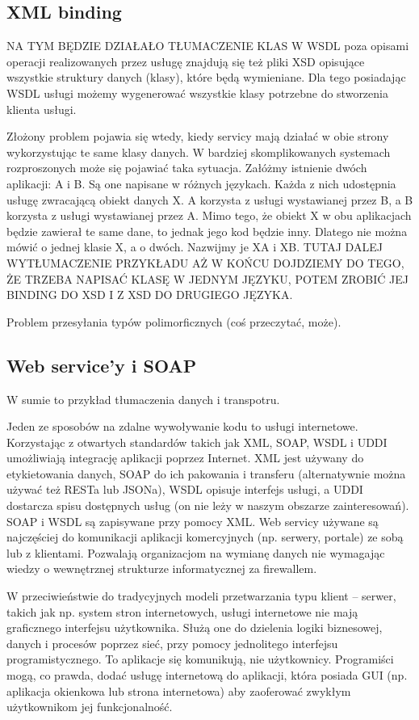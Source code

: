 \subsection{XML binding}
NA TYM BĘDZIE DZIAŁAŁO TŁUMACZENIE KLAS
W WSDL poza opisami operacji realizowanych przez usługę znajdują się też pliki XSD opisujące wszystkie struktury danych (klasy), które będą wymieniane. Dla tego posiadając WSDL usługi możemy wygenerować wszystkie klasy potrzebne do stworzenia klienta usługi.

Złożony problem pojawia się wtedy, kiedy servicy mają działać w obie strony wykorzystując te same klasy danych. W bardziej skomplikowanych systemach rozproszonych może się pojawiać taka sytuacja. Załóżmy istnienie dwóch aplikacji: A i B. Są one napisane w różnych językach. Każda z nich udostępnia usługę zwracającą obiekt danych X. A korzysta z usługi wystawianej przez B, a B korzysta z usługi wystawianej przez A. Mimo tego, że obiekt X w obu aplikacjach będzie zawierał te same dane, to jednak jego kod będzie inny. Dlatego nie można mówić o jednej klasie X, a o dwóch. Nazwijmy je XA i XB. TUTAJ DALEJ WYTŁUMACZENIE PRZYKŁADU AŻ W KOŃCU DOJDZIEMY DO TEGO, ŻE TRZEBA NAPISAĆ KLASĘ W JEDNYM JĘZYKU, POTEM ZROBIĆ JEJ BINDING DO XSD I Z XSD DO DRUGIEGO JĘZYKA.

Problem przesyłania typów polimorficznych (coś przeczytać, może). 

\subsection{Web service'y i SOAP}
W sumie to przykład tłumaczenia danych  i transpotru.

Jeden ze sposobów na zdalne wywoływanie kodu to usługi internetowe. Korzystając z otwartych standardów takich jak XML, SOAP, WSDL i UDDI umożliwiają integrację aplikacji poprzez Internet. XML jest używany do etykietowania danych, SOAP do ich pakowania i transferu (alternatywnie można używać też RESTa lub JSONa), WSDL opisuje interfejs usługi, a UDDI dostarcza spisu dostępnych usług (on nie leży w naszym obszarze zainteresowań). SOAP i WSDL są zapisywane przy pomocy XML. Web servicy używane są najczęściej do komunikacji aplikacji komercyjnych (np. serwery, portale) ze sobą lub z klientami. Pozwalają organizacjom na wymianę danych nie wymagając wiedzy o wewnętrznej strukturze informatycznej za firewallem.

W przeciwieństwie do tradycyjnych modeli przetwarzania typu klient – serwer, takich jak np. system stron internetowych, usługi internetowe nie mają graficznego interfejsu użytkownika. Służą one do dzielenia logiki biznesowej, danych i procesów poprzez sieć, przy pomocy jednolitego interfejsu programistycznego. To aplikacje się komunikują, nie użytkownicy. Programiści mogą, co prawda, dodać usługę internetową do aplikacji, która posiada GUI (np. aplikacja okienkowa lub strona internetowa) aby zaoferować zwykłym użytkownikom jej funkcjonalność.

